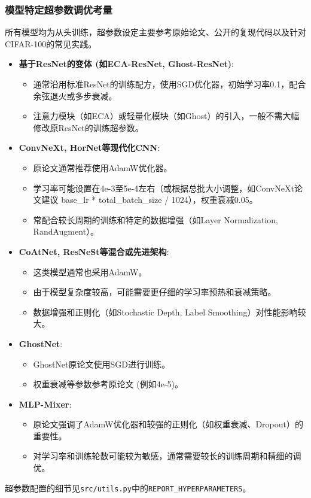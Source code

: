 \documentclass[a4paper]{article}
\begin{document}
\begin{description}
\subsubsection{模型特定超参数调优考量}
所有模型均为从头训练，超参数设定主要参考原始论文、公开的复现代码以及针对CIFAR-100的常见实践。
\begin{itemize}
    \item \textbf{基于ResNet的变体 (如ECA-ResNet, Ghost-ResNet)}:
    \begin{itemize}
        \item 通常沿用标准ResNet的训练配方，使用SGD优化器，初始学习率0.1，配合余弦退火或多步衰减。
        \item 注意力模块（如ECA）或轻量化模块（如Ghost）的引入，一般不需大幅修改原ResNet的训练超参数。
    \end{itemize}
    \item \textbf{ConvNeXt, HorNet等现代化CNN}:
    \begin{itemize}
        \item 原论文通常推荐使用AdamW优化器。
        \item 学习率可能设置在4e-3至5e-4左右（或根据总批大小调整，如ConvNeXt论文建议 base\_lr * total\_batch\_size / 1024），权重衰减0.05。
        \item 常配合较长周期的训练和特定的数据增强（如Layer Normalization, RandAugment）。
    \end{itemize}
    \item \textbf{CoAtNet, ResNeSt等混合或先进架构}:
    \begin{itemize}
        \item 这类模型通常也采用AdamW。
        \item 由于模型复杂度较高，可能需要更仔细的学习率预热和衰减策略。
        \item 数据增强和正则化（如Stochastic Depth, Label Smoothing）对性能影响较大。
    \end{itemize}
    \item \textbf{GhostNet}:
    \begin{itemize}
        \item GhostNet原论文使用SGD进行训练。
        \item 权重衰减等参数参考原论文 (例如4e-5)。
    \end{itemize}
    \item \textbf{MLP-Mixer}:
    \begin{itemize}
        \item 原论文强调了AdamW优化器和较强的正则化（如权重衰减、Dropout）的重要性。
        \item 对学习率和训练轮数可能较为敏感，通常需要较长的训练周期和精细的调优。
    \end{itemize}
\end{itemize}
超参数配置的细节见\texttt{src/utils.py}中的\texttt{REPORT\_HYPERPARAMETERS}。


\end{description}
\end{document}
